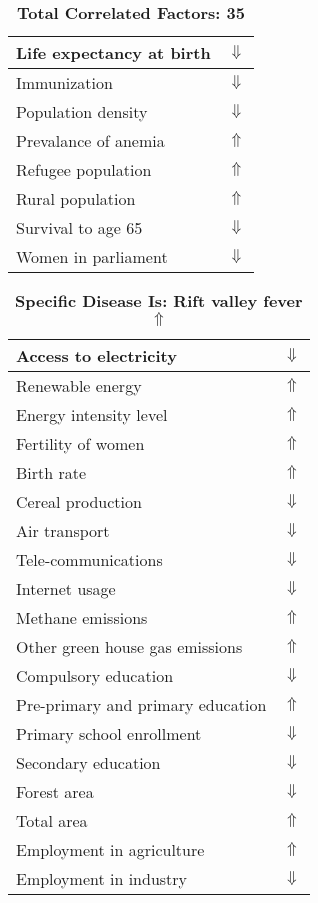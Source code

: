 \documentclass[12pt,notitlepage,oneside]{report}
\begin{document}
\begin{table}[!htb]
\begin{tabular}{|l|l|}
Life expectancy at birth & $\Downarrow$\\ \hline
Immunization & $\Downarrow$\\ \hline
Population density & $\Downarrow$\\ \hline
Prevalance of anemia & $\Uparrow$\\ \hline
Refugee population & $\Uparrow$\\ \hline
Rural population & $\Uparrow$\\ \hline
Survival to age 65 & $\Downarrow$\\ \hline
Women in parliament & $\Downarrow$\\ \hline
\end{tabular}
\caption*{\textbf{Total Correlated Factors: 35}}
\end{table}
\clearpage
\begin{table}[!htb]
\caption{\textbf{Specific Disease Is: Rift valley fever $\Uparrow$}}
\centering
\label{Correlated Socio-economic Factors0}
\begin{tabular}{|l|l|}
\hline
Access to electricity & $\Downarrow$\\ \hline
Renewable energy & $\Uparrow$\\ \hline
Energy intensity level & $\Uparrow$\\ \hline
Fertility of women & $\Uparrow$\\ \hline
Birth rate & $\Uparrow$\\ \hline
Cereal production & $\Downarrow$\\ \hline
Air transport  & $\Downarrow$\\ \hline
Tele-communications & $\Downarrow$\\ \hline
Internet usage & $\Downarrow$\\ \hline
Methane emissions & $\Uparrow$\\ \hline
Other green house gas emissions & $\Uparrow$\\ \hline
Compulsory education & $\Downarrow$\\ \hline
Pre-primary and primary education & $\Uparrow$\\ \hline
Primary school enrollment & $\Downarrow$\\ \hline
Secondary education & $\Downarrow$\\ \hline
Forest area & $\Downarrow$\\ \hline
Total area & $\Uparrow$\\ \hline
Employment in agriculture & $\Uparrow$\\ \hline
Employment in industry & $\Downarrow$\\ \hline

\end{tabular}
\end{table}
\end{document}
